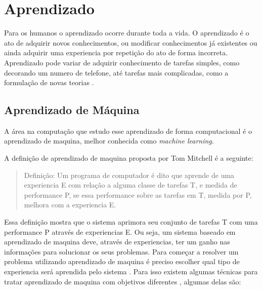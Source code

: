 \section{Aprendizado} 
Para os humanos o aprendizado ocorre durante toda a vida. 
O aprendizado é o ato de adquirir novos conhecimentos, ou modificar conhecimentos já existentes ou ainda adquirir uma experiencia por repetição do ato de forma incorreta. 
Aprendizado pode variar de adquirir conhecimento de tarefas simples, como decorando um numero de telefone, até tarefas mais complicadas, como a formulação de novas teorias \cite{intelligence2003modern}. 

\subsection{Aprendizado de Máquina} 

A área na computação que estudo esse aprendizado de forma computacional é o aprendizado de maquina, melhor conhecida como \textit{machine learning}. 


A definição de aprendizado de maquina proposta por Tom Mitchell \cite{Mitchell1997ML} é a seguinte:

 \begin{quote}
 	Definição: Um programa de computador é dito que aprende de uma experiencia E com relação a alguma classe de tarefas T, e medida de performance P, se essa performance sobre as tarefas em T, medida por P, melhora com a experiencia E.
 \end{quote}

Essa definição mostra que o sistema aprimora seu conjunto de tarefas T com uma performance P através de experiencias E. Ou seja, um sistema baseado em aprendizado de maquina deve, através de experiencias, ter um ganho nas informações para solucionar os seus problemas. Para começar a resolver um problema utilizando aprendizado de maquina é preciso escolher qual tipo de experiencia será aprendida pelo sistema \cite{Mitchell1997ML}. 
Para isso existem algumas técnicas para tratar aprendizado de maquina com objetivos diferentes \cite{intelligence2003modern}, algumas delas são:

